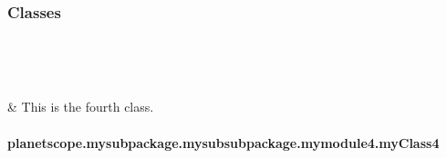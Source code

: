 \documentclass[letterpaper,10pt,english]{sphinxmanual}
\begin{document}
\subsubsection*{Classes}


\begin{savenotes}\sphinxatlongtablestart\begin{longtable}[c]{}
\hline

\endfirsthead

%
{}\\
\hline

\endhead

\hline
{}\\
\endfoot

\endlastfoot

\sphinxAtStartPar
{\hyperref[\detokenize{_autosummary/planetscope.mysubpackage.mysubsubpackage.mymodule4.myClass4:planetscope.mysubpackage.mysubsubpackage.mymodule4.myClass4}]{}}
&
\sphinxAtStartPar
This is the fourth class.
\\
\hline
\end{longtable}\sphinxatlongtableend\end{savenotes}


\paragraph{planetscope.mysubpackage.mysubsubpackage.mymodule4.myClass4}
\label{\detokenize{_autosummary/planetscope.mysubpackage.mysubsubpackage.mymodule4.myClass4:planetscope-mysubpackage-mysubsubpackage-mymodule4-myclass4}}\label{\detokenize{_autosummary/planetscope.mysubpackage.mysubsubpackage.mymodule4.myClass4::doc}}
\end{document}
